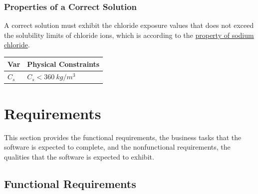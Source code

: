 \documentclass[12pt]{article}
\begin{document}
\noindent 
\subsubsection{Properties of a Correct Solution} \label{sec_CorrectSolution}

\noindent
A correct solution must exhibit the chloride exposure values that does not exceed the solubility limits of chloride ions, which is according to the \href{https://en.m.wikipedia.org/wiki/Sodium_chloride}{property of sodium chloride}.
\begin{table}[!h]
\caption{Output Variables} \label{TblOutputVar}
\renewcommand{\arraystretch}{1.2}
\noindent \begin{longtable*}{l l} 
  \toprule
  \textbf{Var} & \textbf{Physical Constraints} \\
  \midrule 
  $C_s$ & $C_s < 360 ~ kg/m^3$  \\
  
   \bottomrule
\end{longtable*}
\end{table}

\newpage
\section{Requirements}
This section provides the functional requirements, the business tasks that the
software is expected to complete, and the nonfunctional requirements, the
qualities that the software is expected to exhibit.

\indent 
\subsection{Functional Requirements}
\end{document}
